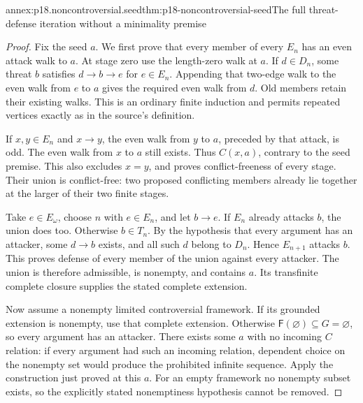 \begin{annexitem}{annex:p18.noncontroversial.seed}{thm:p18-noncontroversial-seed}{The full threat-defense iteration without a minimality premise}
\begin{proof}
Fix the seed \(a\). We first prove
that every member of every \(E_n\)
has an even attack walk to \(a\).
At stage zero use the length-zero
walk at \(a\). If \(d\in D_n\),
some threat \(b\) satisfies
\(d\to b\to e\) for \(e\in E_n\).
Appending that two-edge walk to
the even walk from \(e\) to
\(a\) gives the required even
walk from \(d\). Old members
retain their existing walks.
This is an ordinary finite
induction and permits repeated
vertices exactly as in the
source's definition.

If \(x,y\in E_n\) and \(x\to y\),
the even walk from \(y\) to
\(a\), preceded by that attack,
is odd. The even walk from
\(x\) to \(a\) still exists.
Thus \(C(x,a)\), contrary
to the seed premise.
This also excludes \(x=y\),
and proves conflict-freeness
of every stage. Their union
is conflict-free: two proposed
conflicting members already
lie together at the larger
of their two finite stages.

Take \(e\in E_\omega\), choose
\(n\) with \(e\in E_n\), and
let \(b\to e\). If \(E_n\)
already attacks \(b\), the
union does too. Otherwise
\(b\in T_n\). By the
hypothesis that every argument
has an attacker, some
\(d\to b\) exists, and all
such \(d\) belong to \(D_n\).
Hence \(E_{n+1}\) attacks
\(b\). This proves defense
of every member of the
union against every attacker.
The union is therefore
admissible, is nonempty,
and contains \(a\).
Its transfinite complete
closure supplies the stated
complete extension.

Now assume a nonempty limited
controversial framework.
If its grounded extension
is nonempty, use that
complete extension.
Otherwise \(\mathsf F(\varnothing)
\subseteq G=\varnothing\),
so every argument has
an attacker. There exists
some \(a\) with no incoming
\(C\) relation: if every
argument had such an
incoming relation, dependent
choice on the nonempty
set would produce the
prohibited infinite sequence.
Apply the construction just
proved at this \(a\).
For an empty framework no
nonempty subset exists,
so the explicitly stated
nonemptiness hypothesis
cannot be removed.
\end{proof}
\end{annexitem}


